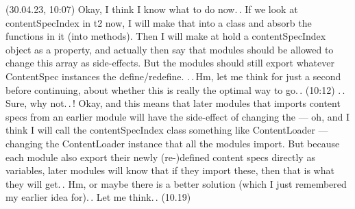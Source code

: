 \documentclass{report}
\begin{document}
(30.04.23, 10:07) Okay, I think I know what to do now.\,. If we look at contentSpecIndex in t2 now, I will make that into a class and absorb the functions in it (into methods). Then I will make at hold a contentSpecIndex object as a property, and actually then say that modules should be allowed to change this array as side-effects. But the modules should still export whatever ContentSpec instances the define/redefine. .\,.\,Hm, let me think for just a second before continuing, about whether this is really the optimal way to go.\,. (10:12) .\,.\,Sure, why not.\,.\,! Okay, and this means that later modules that imports content specs from an earlier module will have the side-effect of changing the --- oh, and I think I will call the contentSpecIndex class something like ContentLoader --- changing the ContentLoader instance that all the modules import. But because each module also export their newly (re-)defined content specs directly as variables, later modules will know that if they import these, then that is what they will get.\,. Hm, or maybe there is a better solution (which I just remembered my earlier idea for).\,. Let me think.\,. (10.19) %
\end{document}
